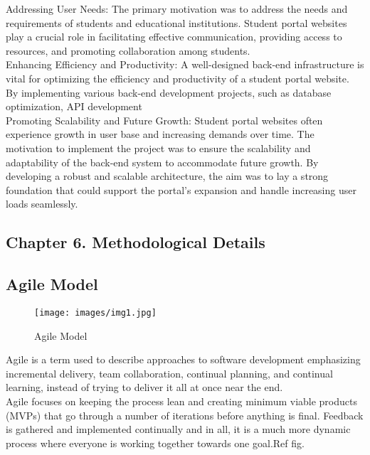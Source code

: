 \documentclass[12pt]{article}
\begin{document}
\medskip
\hspace{1cm}
Addressing User Needs: The primary motivation was to address the needs and requirements of students and educational institutions. Student portal websites play a crucial role in facilitating effective communication, providing access to resources, and promoting collaboration among students.
\medskip\hspace{1cm}\\
Enhancing Efficiency and Productivity: A well-designed back-end infrastructure is vital for optimizing the efficiency and productivity of a student portal website. By implementing various back-end development projects, such as database optimization, API development\\\smallskip \hspace{1cm}Promoting Scalability and Future Growth: Student portal websites often experience growth in user base and increasing demands over time. The motivation to implement the project was to ensure the scalability and adaptability of the back-end system to accommodate future growth. By developing a robust and scalable architecture, the aim was to lay a strong foundation that could support the portal's expansion and handle increasing user loads seamlessly.\\

\pagebreak\newpage
\begin{center}\section*{\Large {Chapter 6. Methodological Details}}\end{center}
\bigskip
\subsection{\large{Agile Model}}
\begin{figure}[ht]
\centering
\texttt{[image: images/img1.jpg]}
\caption{Agile Model }
\label{fig:example}
\end{figure}
\hspace{1cm}Agile is a term used to describe approaches to software development emphasizing incremental delivery, team collaboration, continual planning, and continual learning, instead of trying to deliver it all at once near the end. \\

\hspace{1cm}Agile focuses on keeping the process lean and creating minimum viable products (MVPs) that go through a number of iterations before anything is final. Feedback is gathered and implemented continually and in all, it is a much more dynamic process where everyone is working together towards one goal.Ref fig.
\\
\end{document}
